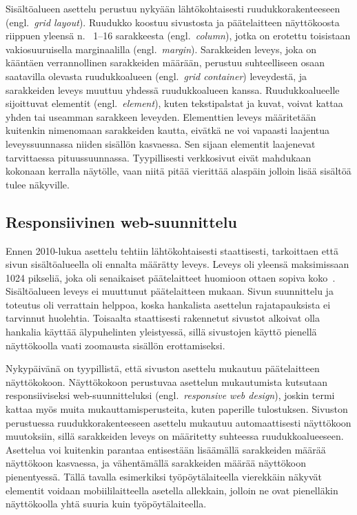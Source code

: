 \documentclass[finnish, 12pt, a4paper, elec, utf8, a-1b, online]{aaltothesis}
\begin{document}
Sisältöalueen asettelu perustuu nykyään lähtökohtaisesti ruudukkorakenteeseen
(engl.\ \textit{grid layout}). Ruudukko koostuu sivustosta ja päätelaitteen
näyttökoosta riippuen yleensä n. \ 1--16 sarakkeesta (engl.\ \textit{column}),
jotka on erotettu toisistaan vakiosuuruisella marginaalilla (engl.\
\textit{margin}). Sarakkeiden leveys, joka on kääntäen verrannollinen
sarakkeiden määrään, perustuu suhteelliseen osaan saatavilla olevasta
ruudukkoalueen (engl.\ \textit{grid container}) leveydestä, ja sarakkeiden
leveys muuttuu yhdessä ruudukkoalueen kanssa. Ruudukkoalueelle sijoittuvat
elementit (engl.\ \textit{element}), kuten tekstipalstat ja kuvat, voivat kattaa
yhden tai useamman sarakkeen leveyden. Elementtien leveys määritetään kuitenkin
nimenomaan sarakkeiden kautta, eivätkä ne voi vapaasti laajentua leveyssuunnassa
niiden sisällön kasvaessa. Sen sijaan elementit laajenevat tarvittaessa
pituussuunnassa. Tyypillisesti verkkosivut eivät mahdukaan kokonaan kerralla
näytölle, vaan niitä pitää vierittää alaspäin jolloin lisää sisältöä tulee
näkyville.

\subsection{Responsiivinen web-suunnittelu}\label{responsive-web-design}

Ennen 2010-lukua asettelu tehtiin lähtökohtaisesti staattisesti, tarkoittaen
että sivun sisältöalueella oli ennalta määrätty leveys. Leveys oli yleensä
maksimissaan 1024 pikseliä, joka oli senaikaiset päätelaitteet huomioon ottaen sopiva
koko~\cite{viite?}. Sisältöalueen leveys ei muuttunut päätelaitteen mukaan. Sivun suunnittelu
ja toteutus oli verrattain helppoa, koska hankalista asettelun rajatapauksista
ei tarvinnut huolehtia. Toisaalta staattisesti rakennetut sivustot alkoivat olla
hankalia käyttää älypuhelinten yleistyessä, sillä sivustojen käyttö pienellä
näyttökoolla vaati zoomausta sisällön erottamiseksi.

Nykypäivänä on tyypillistä, että sivuston asettelu mukautuu päätelaitteen
näyttökokoon. Näyttökokoon perustuvaa asettelun mukautumista kutsutaan
responsiiviseksi web-suunnitteluksi (engl.\ \textit{responsive web design}),
joskin termi kattaa myös muita mukauttamisperusteita, kuten paperille
tulostuksen. Sivuston perustuessa ruudukkorakenteeseen asettelu mukautuu
automaattisesti näyttökoon muutoksiin, sillä sarakkeiden leveys on määritetty
suhteessa ruudukkoalueeseen. Asettelua voi kuitenkin parantaa entisestään
lisäämällä sarakkeiden määrää näyttökoon kasvaessa, ja vähentämällä sarakkeiden
määrää näyttökoon pienentyessä. Tällä tavalla esimerkiksi työpöytälaiteella
vierekkäin näkyvät elementit voidaan mobiililaitteella asetella allekkain,
jolloin ne ovat pienelläkin näyttökoolla yhtä suuria kuin työpöytälaiteella.
\end{document}
